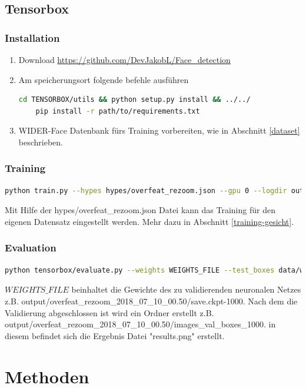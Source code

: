 \section{Tensorbox}
\subsection{Installation}
\begin{enumerate}
\item Download  \url{https://github.com/DevJakobL/Face_detection}
\item Am speicherungsort folgende befehle ausführen
\begin{lstlisting}[language=bash]
	cd TENSORBOX/utils && python setup.py install && ../../
	pip install -r path/to/requirements.txt
\end{lstlisting}
\item WIDER-Face Datenbank fürs Training vorbereiten, wie in Abschnitt \ref{dataset} beschrieben.
\end{enumerate}
\subsection{Training }
\begin{lstlisting}[language=bash]
python train.py --hypes hypes/overfeat_rezoom.json --gpu 0 --logdir output
\end{lstlisting}
Mit Hilfe der hypes/overfeat\_rezoom.json Datei kann das Training für den eigenen Datensatz eingestellt werden. Mehr dazu in Abschnitt \ref{training-gesicht}.
\newpage
\subsection{Evaluation}
\begin{lstlisting}[language=bash]
python tensorbox/evaluate.py --weights WEIGHTS_FILE --test_boxes data/wider_val.jason
\end{lstlisting}
$WEIGHTS\_FILE$ beinhaltet die Gewichte des zu validierenden neuronalen Netzes \\z.B. output/overfeat\_rezoom\_2018\_07\_10\_00.50/save.ckpt-1000. Nach dem die Validierung abgeschlossen ist wird ein Ordner erstellt z.B. output/overfeat\_rezoom\_2018\_07\_10\_00.50/images\_val\_boxes\_1000. in diesem befindet sich die Ergebnis Datei "results.png" erstellt.

\chapter{Methoden}%
